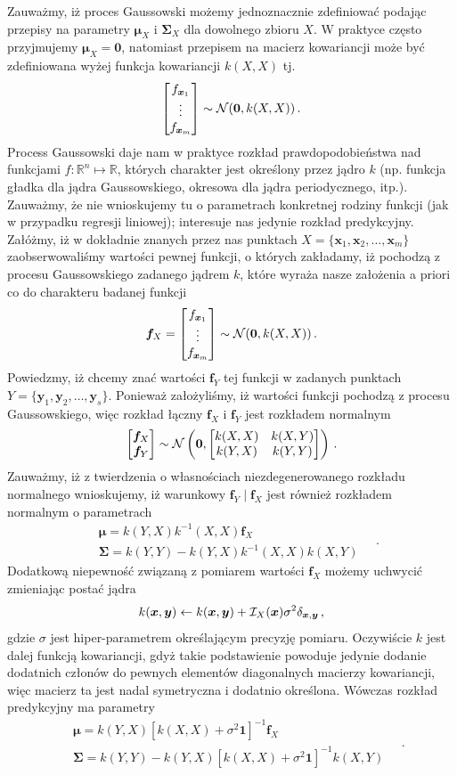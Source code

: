 \documentclass{myclass}
\begin{document}
Zauważmy, iż proces Gaussowski możemy jednoznacznie zdefiniować podając przepisy na parametry
\(\bm{\mu}_X\) i \(\bm{\Sigma}_X\) dla dowolnego zbioru \(X\). W praktyce często przyjmujemy
\(\bm{\mu}_X = \bm{0}\), natomiast przepisem na macierz kowariancji może być zdefiniowana wyżej
funkcja kowariancji \(k(X,X)\) tj.
\[
\mqty[f_{\bm{x}_1} \\ \vdots \\ f_{\bm{x}_m}] \sim \mc{N}(\bm{0}, k(X,X))\,.
\]
Process Gaussowski daje nam w praktyce rozkład prawdopodobieństwa nad funkcjami
\(f:\mathbb{R}^n\mapsto\mathbb{R}\), których charakter jest określony przez jądro \(k\) (np. funkcja
gładka dla jądra Gaussowskiego, okresowa dla jądra periodycznego, itp.). Zauważmy, że nie
wnioskujemy tu o parametrach konkretnej rodziny funkcji (jak w przypadku regresji liniowej);
interesuje nas jedynie rozkład predykcyjny. Załóżmy, iż w dokładnie znanych przez nas punktach \(X =
\{\bm{x}_1,\bm{x}_2,\ldots,\bm{x}_m\}\) zaobserwowaliśmy wartości pewnej funkcji, o których
zakładamy, iż pochodzą z procesu Gaussowskiego zadanego jądrem \(k\), które wyraża nasze założenia a
priori co do charakteru badanej funkcji
\[
\bm{f}_X = \mqty[f_{\bm{x}_1} \\ \vdots \\ f_{\bm{x}_m}] \sim \mc{N}(\bm{0}, k(X,X))\,.
\]
Powiedzmy, iż chcemy znać wartości \(\bm{f}_Y\) tej funkcji w zadanych punktach \(Y =
\{\bm{y}_1,\bm{y}_2,\ldots,\bm{y}_s\}\). Ponieważ założyliśmy, iż wartości funkcji pochodzą z
procesu Gaussowskiego, więc rozkład łączny \(\bm{f}_X\) i \(\bm{f}_Y\) jest rozkładem normalnym
\[
\mqty[\bm{f}_X \\ \bm{f}_Y] \sim \mc{N}\left(\bm{0}, \mqty[k(X,X) & k(X,Y) \\ k(Y,X) & k(Y,Y)]\right)\,.
\]
Zauważmy, iż z twierdzenia o własnościach niezdegenerowanego rozkładu normalnego wnioskujemy, iż
warunkowy \(\bm{f}_Y\mid \bm{f}_X\) jest również rozkładem normalnym o parametrach
\[
\begin{split}
&\bm{\mu} = k(Y,X)k^{-1}(X,X)\bm{f}_X\\
&\bm{\Sigma} = k(Y,Y) - k(Y,X)k^{-1}(X,X)k(X,Y)
\end{split}\quad.
\]
Dodatkową niepewność związaną z pomiarem wartości \(\bm{f}_X\) możemy uchwycić zmieniając postać
jądra 
\[
k(\bm{x},\bm{y}) \leftarrow k(\bm{x},\bm{y}) + \mathcal{I}_X(\bm{x})\sigma^2\delta_{\bm{x},\bm{y}}\,,
\]
gdzie \(\sigma\) jest hiper-parametrem określającym precyzję pomiaru. Oczywiście \(k\) jest dalej
funkcją kowariancji, gdyż takie podstawienie powoduje jedynie dodanie dodatnich członów do pewnych
elementów diagonalnych macierzy kowariancji, więc macierz ta jest nadal symetryczna i dodatnio
określona. Wówczas rozkład predykcyjny ma parametry
\[
\boxed{
\begin{split}
&\bm{\mu} = k(Y,X)\left[k(X,X) + \sigma^2\bm{1}\right]^{-1}\bm{f}_X\\
&\bm{\Sigma} = k(Y,Y) - k(Y,X)\left[k(X,X) + \sigma^2\bm{1}\right]^{-1}k(X,Y)
\end{split}\quad.
}
\]
\end{document}
